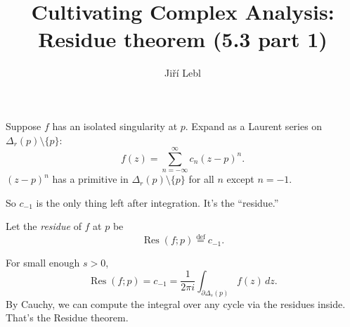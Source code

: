 \documentclass[10pt,aspectratio=169]{beamer}
\author{Ji\v{r}\'i Lebl}
\institute[OSU]{%
Departemento pri Matematiko de Oklahoma {\^S}tata Universitato}
\title{Cultivating Complex Analysis:\\%
Residue theorem (5.3 part 1)}
\date{}
\begin{document}
\begin{frame}
\titlepage
\end{frame}

\begin{frame}
Suppose $f$ has an isolated singularity at $p$.
\pause Expand 
as a Laurent series on $\Delta_r(p) \setminus \{ p \}$:
\[
f(z) = \sum_{n=-\infty}^\infty c_n {(z-p)}^n .
\]
\pause
${(z-p)}^n$ has a primitive in 
$\Delta_r(p) \setminus \{ p \}$ for all $n$ except $n=-1$.

\medskip
\pause

So $c_{-1}$ is the only thing left after integration. \pause It's the ``residue.''

\pause

\begin{definition}
Let the \emph{residue} of $f$ at $p$ be
\begin{equation*}
\operatorname{Res}(f;p)
\overset{\text{def}}{=}
c_{-1} .
\end{equation*}
\end{definition}

\pause

For small enough $s > 0$,
\[
\operatorname{Res}(f;p) 
=
c_{-1}
=
\frac{1}{2\pi i} \int_{\partial \Delta_{s}(p)} f(z) \, dz .
\]
\pause
By Cauchy, we can compute the integral over any cycle via the residues
inside.  That's the Residue theorem.
\end{frame}
\end{document}
